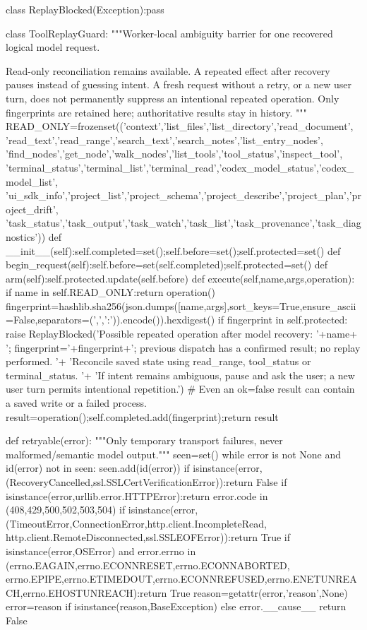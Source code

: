 class ReplayBlocked(Exception):pass

class ToolReplayGuard:
    """Worker-local ambiguity barrier for one recovered logical model request.

    Read-only reconciliation remains available. A repeated effect after recovery
    pauses instead of guessing intent. A fresh request without a retry, or a new
    user turn, does not permanently suppress an intentional repeated operation.
    Only fingerprints are retained here; authoritative results stay in history.
    """
    READ_ONLY=frozenset(('context','list_files','list_directory','read_document',
        'read_text','read_range','search_text','search_notes','list_entry_nodes',
        'find_nodes','get_node','walk_nodes','list_tools','tool_status','inspect_tool',
        'terminal_status','terminal_list','terminal_read','codex_model_status','codex_model_list',
        'ui_sdk_info','project_list','project_schema','project_describe','project_plan','project_drift',
        'task_status','task_output','task_watch','task_list','task_provenance','task_diagnostics'))
    def __init__(self):self.completed=set();self.before=set();self.protected=set()
    def begin_request(self):self.before=set(self.completed);self.protected=set()
    def arm(self):self.protected.update(self.before)
    def execute(self,name,args,operation):
        if name in self.READ_ONLY:return operation()
        fingerprint=hashlib.sha256(json.dumps([name,args],sort_keys=True,ensure_ascii=False,separators=(',',':')).encode()).hexdigest()
        if fingerprint in self.protected:
            raise ReplayBlocked('Possible repeated operation after model recovery: '+name+
                '; fingerprint='+fingerprint+'; previous dispatch has a confirmed result; no replay performed. '+
                'Reconcile saved state using read_range, tool_status or terminal_status. '+
                'If intent remains ambiguous, pause and ask the user; a new user turn permits intentional repetition.')
        # Even an ok=false result can contain a saved write or a failed process.
        result=operation();self.completed.add(fingerprint);return result


def retryable(error):
    """Only temporary transport failures, never malformed/semantic model output."""
    seen=set()
    while error is not None and id(error) not in seen:
        seen.add(id(error))
        if isinstance(error,(RecoveryCancelled,ssl.SSLCertVerificationError)):return False
        if isinstance(error,urllib.error.HTTPError):return error.code in (408,429,500,502,503,504)
        if isinstance(error,(TimeoutError,ConnectionError,http.client.IncompleteRead,
                             http.client.RemoteDisconnected,ssl.SSLEOFError)):return True
        if isinstance(error,OSError) and error.errno in (errno.EAGAIN,errno.ECONNRESET,errno.ECONNABORTED,
                errno.EPIPE,errno.ETIMEDOUT,errno.ECONNREFUSED,errno.ENETUNREACH,errno.EHOSTUNREACH):return True
        reason=getattr(error,'reason',None)
        error=reason if isinstance(reason,BaseException) else error.__cause__
    return False


